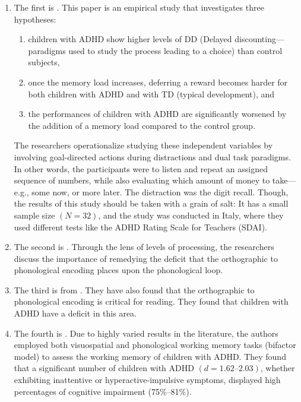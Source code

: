\documentclass[stu]{apa7}
\begin{document}
\begin{enumerate}
	\item The first is \textcite{fabio_working_2020}. This paper is an empirical study that investigates three hypotheses:
	\begin{enumerate}
		\item children with ADHD show higher levels of DD (Delayed discounting---paradigms used to study the process leading to a choice) than control subjects,
		\item once the memory load increases, deferring a reward becomes harder for both children with ADHD and with TD (typical development), and
		\item the performances of children with ADHD are significantly worsened by the addition of a memory load compared to the control group.
	\end{enumerate}
	The researchers operationalize studying these independent variables by involving goal-directed actions during distractions and dual task paradigms. In other words, the participants were to listen and repeat an assigned sequence of numbers, while also evaluating which amount of money to take---e.g., some now, or more later. The distraction was the digit recall. Though, the results of this study should be taken with a grain of salt: It has a small sample size \((N = 32)\), and the study was conducted in Italy, where they used different tests like the ADHD Rating Scale for Teachers (SDAI). 

	\item The second is \textcite{raiker_phonological_2019}. Through the lens of levels of processing, the researchers discuss the importance of remedying the deficit that the orthographic to phonological encoding places upon the phonological loop. 

	\item The third is from \textcite{friedman_reading_2017}. They have also found that the orthographic to phonological encoding is critical for reading. They found that children with ADHD have a deficit in this area.

	\item The fourth is \textcite{kofler_working_2020}. Due to highly varied results in the literature, the authors employed both visuospatial and phonological working memory tasks (bifactor model) to assess the working memory of children with ADHD. They found that a significant number of children with ADHD \((d = 1.62 \text{--} 2.03)\), whether exhibiting inattentive or hyperactive-impulsive symptoms, displayed high percentages of cognitive impairment (75\%--81\%). 


\end{enumerate}
\end{document}
